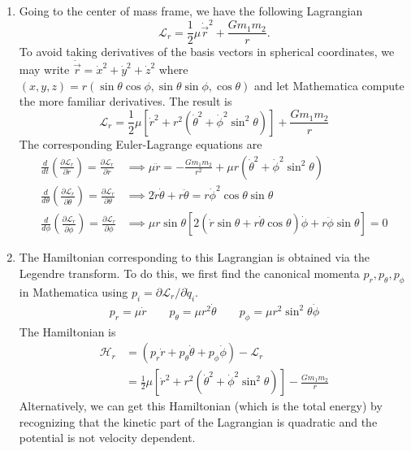 \documentclass{article}
\theoremstyle{definition}
\newcommand{\p}{\partial}
\newcommand{\lag}{\mathcal{L}}
\newcommand{\ham}{\mathcal{H}}
\newcommand{\f}[2]{\frac{#1}{#2}}
\newcommand{\lp}{\left(}
\newcommand{\rp}{\right)}
\newcommand{\lb}{\left[}
\newcommand{\rb}{\right]}
\begin{document}
\begin{enumerate}[label=(\alph*)]
	
	\item Going to the center of mass frame, we have the following Lagrangian
	\begin{equation*}
	\lag_r = \f{1}{2} \mu \dot{\vec{r}}^2 + \f{Gm_1m_2}{r}.
	\end{equation*}
	To avoid taking derivatives of the basis vectors in spherical coordinates, we may write $\dot{\vec{r}} = \dot{x}^2 + \dot{y}^2 + \dot{z}^2$ where $(x,y,z) = r(\sin\theta\cos\phi, \sin\theta\sin\phi, \cos\theta)$ and let Mathematica compute the more familiar derivatives. The result is 
	\begin{equation*}
	\boxed{\lag_r = \f{1}{2}\mu \lb  \dot{r}^2 + r^2\lp\dot{\theta}^2 + \dot{\phi}^2\sin^2\theta \rp  \rb + \f{Gm_1m_2}{r}}
	\end{equation*}
	The corresponding Euler-Lagrange equations are
	\begin{align*}
	\f{d}{dt}\lp \f{\p \lag_r}{\p \dot{r}}\rp = \f{\p \lag_r}{\p r}  
	&\implies 
	\mu \ddot{r} = -\f{G m_1 m_2}{r^2} + \mu r\lp\dot{\theta}^2 + \dot{\phi}^2\sin^2\theta\rp\\
	\f{d}{d\theta}\lp \f{\p \lag_r}{\p \dot{\theta}}\rp = \f{\p \lag_r}{\p \theta}  
	&\implies 
	2\dot{r}\dot{\theta} + r\ddot{\theta} = r\dot{\phi}^2\cos\theta \sin\theta \\
	\f{d}{d\phi}\lp \f{\p \lag_r}{\p \dot{\phi}}\rp = \f{\p \lag_r}{\p \phi} 
	&\implies 
	\mu r \sin\theta \lb 2\lp \dot{r}\sin\theta  + r \dot{\theta} \cos\theta \rp \dot{\phi} + r \ddot{\phi} \sin\theta \rb =0
	\end{align*}
	
	\item The Hamiltonian corresponding to this Lagrangian is obtained via the Legendre transform. To do this, we first find the canonical momenta $p_r, p_\theta, p_\phi$ in Mathematica using $p_i = \p \lag_r/ \p \dot{q}_i$. 
	\begin{align*}
	p_r = \mu \dot{r} \quad\quad p_\theta = \mu r^2 \dot{\theta} \quad\quad p_\phi = \mu r^2\sin^2\theta \dot{\phi}
	\end{align*}
	The Hamiltonian is 
	\begin{align*}
	\ham_r &= \lp p_r \dot{r} + p_\theta \dot{\theta} + p_\phi \dot{\phi} \rp - \lag_r \\
	&= \boxed{\f{1}{2}\mu \lb \dot{r}^2 + r^2 \lp \dot{\theta}^2+ \dot{\phi}^2\sin^2\theta  \rp \rb - \f{Gm_1m_2}{r}}
	\end{align*}
	Alternatively, we can get this Hamiltonian (which is the total energy) by recognizing that the kinetic part of the Lagrangian is quadratic and the potential is not velocity dependent. \\
	

\end{enumerate}
\end{document}
